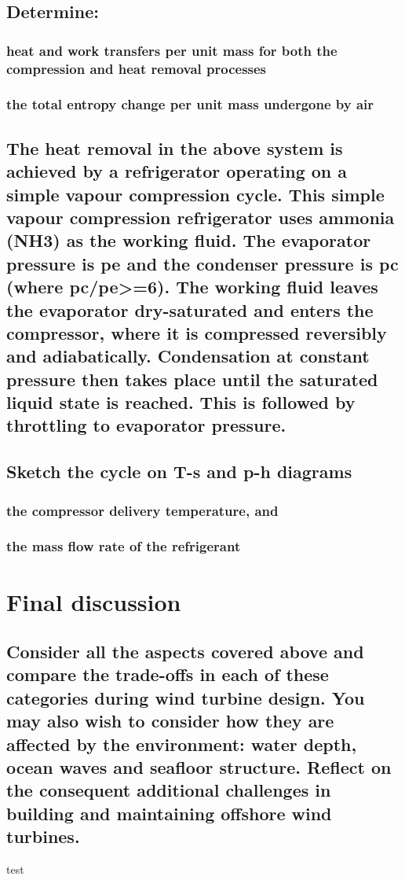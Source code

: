\documentclass[12pt]{article}
\numberwithin{equation}{section}
\begin{document}
\begin{flushleft}
\subsection{Determine:}
\subsubsection{heat and work transfers per unit mass for both the compression and heat removal processes}
\subsubsection{the total entropy change per unit mass undergone by air}
\subsection{The heat removal in the above system is achieved by a refrigerator operating on a simple vapour compression cycle. This simple vapour compression refrigerator uses ammonia (NH3) as the working fluid. The evaporator pressure is pe and the condenser pressure is pc (where pc/pe>=6). The working fluid leaves the evaporator dry-saturated and enters the compressor, where it is compressed reversibly and adiabatically. Condensation at constant pressure then takes place until the saturated liquid state is reached. This is followed by throttling to evaporator pressure.}
\subsection{Sketch the cycle on T-s and p-h diagrams}
\subsubsection{the compressor delivery temperature, and}
\subsubsection{the mass flow rate of the refrigerant}

\section{Final discussion}
\subsection{Consider all the aspects covered above and compare the trade-offs in each of these categories during wind turbine design. You may also wish to consider how they are affected by the environment: water depth, ocean waves and seafloor structure. Reflect on the consequent additional challenges in building and maintaining offshore wind turbines.}
test



\end{flushleft}
\end{document}
